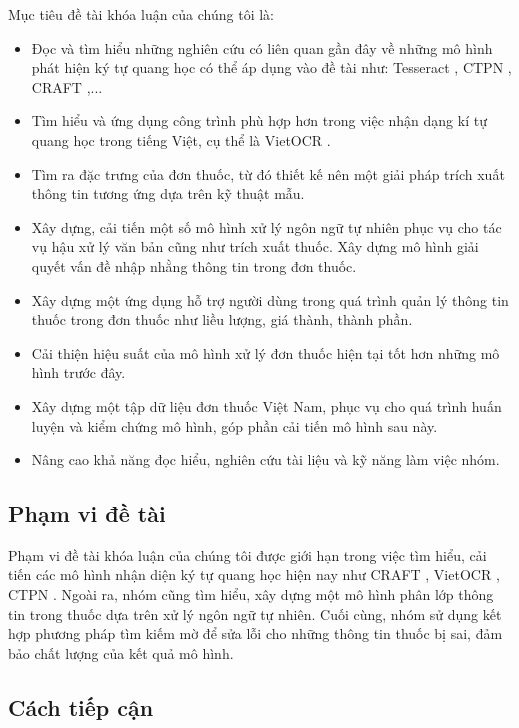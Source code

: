 Mục tiêu đề tài khóa luận của chúng tôi là:
    \begin{itemize}
     \item Đọc và tìm hiểu những nghiên cứu có liên quan gần đây về những mô hình phát hiện ký tự quang học có thể áp dụng vào đề tài như: Tesseract \cite{smith2007overview}, CTPN \cite{tian2016detecting}, CRAFT \cite{baek2019character},...  
     \item Tìm hiểu và ứng dụng công trình phù hợp hơn trong việc nhận dạng kí tự quang học trong tiếng Việt, cụ thể là VietOCR \cite{VietOCR} .
     \item Tìm ra đặc trưng của đơn thuốc, từ đó thiết kế nên một giải pháp trích xuất thông tin tương ứng dựa trên kỹ thuật mẫu.
     \item Xây dựng, cải tiến một số mô hình xử lý ngôn ngữ tự nhiên phục vụ cho tác vụ hậu xử lý văn bản cũng như trích xuất thuốc.
     \tiem Xây dựng mô hình giải quyết vấn đề nhập nhằng thông tin trong đơn thuốc.
     \item Xây dựng một ứng dụng hỗ trợ người dùng trong quá trình quản lý thông tin thuốc trong đơn thuốc như liều lượng, giá thành, thành phần.
     \item Cải thiện hiệu suất của mô hình xử lý đơn thuốc hiện tại tốt hơn những mô hình trước đây. 
     \item Xây dựng một tập dữ liệu đơn thuốc Việt Nam, phục vụ cho quá trình huấn luyện và kiểm chứng mô hình, góp phần cải tiến mô hình sau này.
     \item Nâng cao khả năng đọc hiểu, nghiên cứu tài liệu và kỹ năng làm việc nhóm.
    \end{itemize}

\subsection*{Phạm vi đề tài}

Phạm vi đề tài khóa luận của chúng tôi được giới hạn trong việc tìm hiểu, cải tiến các mô hình nhận diện ký tự quang học hiện nay như CRAFT \cite{baek2019character}, VietOCR \cite{VietOCR}, CTPN \cite{tian2016detecting}. Ngoài ra, nhóm cũng tìm hiểu, xây dựng một mô hình phân lớp thông tin trong thuốc dựa trên xử lý ngôn ngữ tự nhiên. Cuối cùng, nhóm sử dụng kết hợp phương pháp tìm kiếm mờ để sửa lỗi cho những thông tin thuốc bị sai, đảm bảo chất lượng của kết quả mô hình.

\subsection*{Cách tiếp cận}

